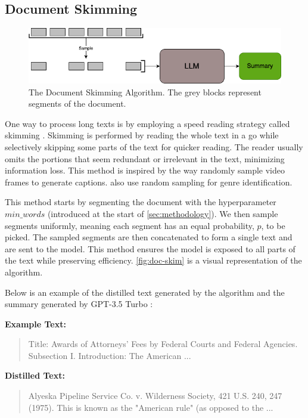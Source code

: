 \subsection{Document Skimming}
\label{method:skimming}

\begin{figure}[!ht]
  \centering
  \includegraphics[width=.8\textwidth]{images/doc-skim.png}
  \caption{The Document Skimming Algorithm. The grey blocks represent segments of the document.}
  \label{fig:doc-skim}
\end{figure}

One way to process long texts is by employing a speed reading strategy called skimming \cite{dhillon2020effect}.
Skimming is performed by reading the whole text in a go while selectively skipping some parts of the text for quicker reading.
The reader usually omits the portions that seem redundant or irrelevant in the text, minimizing information loss.
This method is inspired by the way \citet{wang2024videoagent} randomly sample video frames to generate captions.
\citet{worsham-kalita-2018-genre} also use random sampling for genre identification.

This method starts by segmenting the document with the hyperparameter $min\_words$ (introduced at the start of \autoref{sec:methodology}).
We then sample segments uniformly, meaning each segment has an equal probability, $p$, to be picked.
The sampled segments are then concatenated to form a single text and are sent to the model.
This method ensures the model is exposed to all parts of the text while preserving efficiency.
\autoref{fig:doc-skim} is a visual representation of the algorithm.

Below is an example of the distilled text generated by the algorithm and the summary generated by GPT-3.5 Turbo \cite{brown2020language}:

\noindent \textbf{Example Text:}
\begin{quote}
  Title: Awards of Attorneys' Fees by Federal Courts and Federal Agencies.
  Subsection I. Introduction: The American ...
\end{quote}

\noindent \textbf{Distilled Text:}
\begin{quote}
  Alyeska Pipeline Service Co. v. Wilderness Society, 421 U.S. 240, 247 (1975). This is known as the "American rule" (as opposed to the ...
\end{quote}

